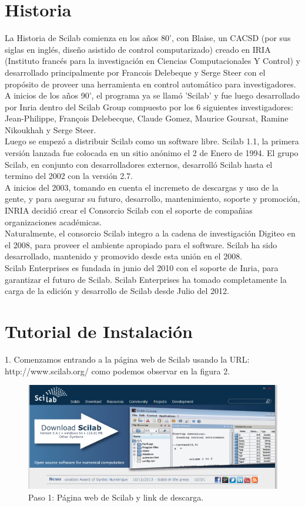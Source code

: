 \documentclass[11pt]{article} %
\begin{document}
\section{Historia}
La Historia de Scilab comienza en los años 80', con Blaise, un CACSD (por sus siglas en inglés, diseño asistido de control computarizado) creado en IRIA (Instituto francés para la investigación en Ciencias Computacionales Y Control) y desarrollado principalmente por Francois Delebeque y Serge Steer con el propósito de proveer una herramienta en control automático para investigadores.
\\%
A inicios de los años 90', el programa ya se llamó 'Scilab' y fue luego desarrollado por Inria dentro del Scilab Group compuesto por los 6 siguientes investigadores: Jean-Philippe, François Delebecque, Claude Gomez, Maurice Goursat, Ramine Nikoukhah y Serge Steer.
\\%
Luego se empezó a distribuir Scilab como un software libre. Scilab 1.1, la primera versión lanzada fue colocada en un sitio anónimo el 2 de Enero de 1994. El grupo Scilab, en conjunto con desarrolladores externos, desarrolló Scilab hasta el termino del 2002 con la versión 2.7.
\\%
A inicios del 2003, tomando en cuenta el incremeto de descargas y uso de la gente, y para asegurar su futuro, desarrollo, mantenimiento, soporte y promoción, INRIA decidió crear el Consorcio Scilab  con el soporte de compañias organizaciones académicas.
\\%
Naturalmente, el consorcio Scilab integro a la cadena de investigación Digiteo en el 2008, para proveer el ambiente apropiado para el software. Scilab ha sido desarrollado, mantenido y promovido desde esta unión en el 2008. 
\\%
Scilab Enterprises es fundada in junio del 2010 con el soporte de Inria, para garantizar el futuro de Scilab. Scilab Enterprises ha tomado completamente la carga de la edición y desarrollo de Scilab desde Julio del 2012.
\section{Tutorial de Instalación}

1.	Comenzamos entrando a la página web de Scilab usando la URL: http://www.scilab.org/ como podemos observar en la figura 2.
\\%
\begin{figure}[!h]
  \centering
    \includegraphics[scale=0.5]{Captura1}
  \caption{Paso 1: Página web de Scilab y link de descarga.}
  \label{fig:paso1}
\end{figure}
\\%
\end{document}
